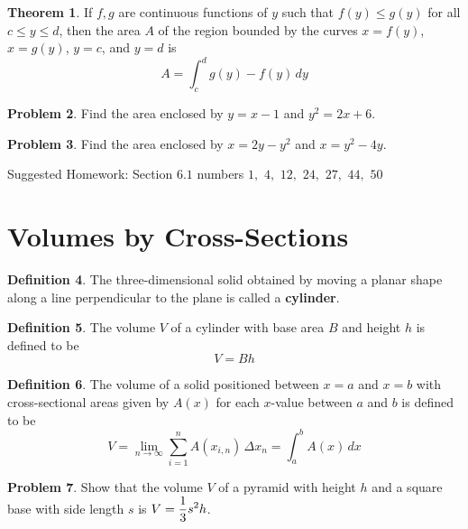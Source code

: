 \documentclass[letterpaper, twoside, 12pt]{book}
\theoremstyle{definition}
\newtheorem{theorem}{Theorem}
\theoremstyle{definition}
\newtheorem{definition}[theorem]{Definition}
\newtheorem{problem}[theorem]{Problem}
\newcommand{\ds}{\ensuremath{\displaystyle}}
\begin{document}
\begin{theorem}
  If $f,g$ are continuous functions of $y$ such that $f(y)\leq g(y)$ for all
  $c\leq y\leq d$, then the area $A$ of the region bounded by the curves
  $x = f(y)$, $x = g(y)$, $y = c$, and $y = d$ is
  \[
    A = \int_c^d g(y) - f(y) \, dy
  \]
\end{theorem}

\begin{problem}
 Find the area enclosed by $y = x-1$ and $y^2 = 2x+6$.
\end{problem}

\vfill

\begin{problem}
 Find the area enclosed by $x = 2y-y^2$ and $x = y^2-4y$.
\end{problem}

\vfill

\noindent Suggested Homework: Section $6.1$ numbers
  $1,$ $4,$ $12,$ $24,$ $27,$ $44,$ $50$

\newpage

\section{Volumes by Cross-Sections}

\begin{definition}
  The three-dimensional solid obtained by moving a planar shape
  along a line perpendicular to the plane is called a \textbf{cylinder}.
\end{definition}

\begin{definition}
  The volume $V$ of a cylinder with base area $B$ and height $h$ is defined
  to be
  \[
    V = Bh
  \]
\end{definition}

\begin{definition}
  The volume of a solid positioned between $x=a$ and $x=b$ with cross-sectional
  areas given by $A(x)$ for each $x$-value between $a$ and $b$ is defined to be
  \[
    V
      =
    \lim_{n\to\infty} \sum_{i=1}^n A(x_{i,n})\,\Delta x_n
      =
    \int_a^b A(x)\,dx
  \]
\end{definition}

\begin{problem}
  Show that the volume $V$ of a pyramid with height $h$
  and a square base with side length $s$ is $\ds V = \frac{1}{3}s^2h$.
\end{problem}
\end{document}

